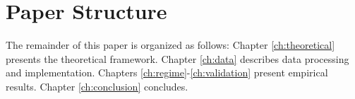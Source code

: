 \section{Paper Structure}
The remainder of this paper is organized as follows:
Chapter \ref{ch:theoretical} presents the theoretical framework.
Chapter \ref{ch:data} describes data processing and implementation.
Chapters \ref{ch:regime}-\ref{ch:validation} present empirical results.
Chapter \ref{ch:conclusion} concludes.

